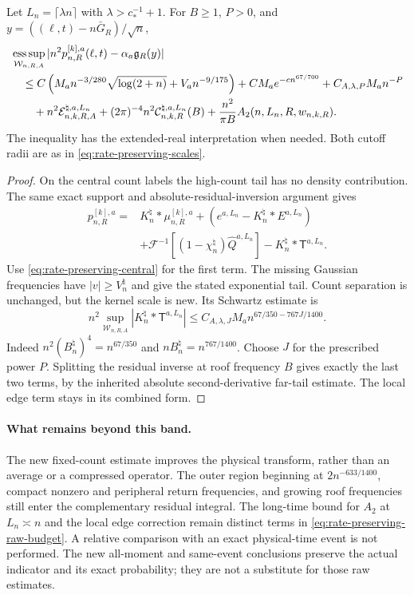 \begin{corollary}
\label{cor:rate-preserving-raw-budget}
Let $L_n=\lceil\lambda n\rceil$ with $\lambda>c_*^{-1}+1$.
For $B\ge1$, $P>0$, and $y=((\ell,t)-n\bar G_R)/\sqrt n$,
\begin{align}
 &\mathop{\rm ess\,sup}_{\mathcal W_{n,R,A}}
        |n^2p_{n,R}^{[k],a}(\ell,t)-\alpha_a\mathfrak g_R(y)|\notag\\
 &\quad\le C\left(M_an^{-3/280}\sqrt{\log(2+n)}+V_an^{-9/175}\right)
      +CM_ae^{-c n^{67/700}}+C_{A,\lambda,P}M_an^{-P}\notag\\
 &\qquad+n^2\mathcal E^{\natural,a,L_n}_{n,k,R,A}
     +(2\pi)^{-4}n^2\mathcal C^{\natural,a,L_n}_{n,k,R}(B)
     +\frac{n^2}{\pi B}A_2(n,L_n,R,w_{n,k,R}).
 \label{eq:rate-preserving-raw-budget}
\end{align}
The inequality has the extended-real interpretation when needed.
Both cutoff radii are as in \eqref{eq:rate-preserving-scales}.
\end{corollary}
\begin{proof}
On the central count labels the high-count tail has no density
contribution. The same exact support and absolute-residual-inversion
argument gives
\begin{align*}
 p_{n,R}^{[k],a}={}&K_n^\natural*\mu_{n,R}^{[k],a}
       +(e^{a,L_n}-K_n^\natural*E^{a,L_n})\\
 &+\mathcal F^{-1}[(1-\chi_n^\natural)\widehat Q^{a,L_n}]
       -K_n^\natural*\mathsf T^{a,L_n}.
\end{align*}
Use \eqref{eq:rate-preserving-central} for the first term. The missing
Gaussian frequencies have $|v|\ge V_n^\natural$ and give the stated
exponential tail. Count separation is unchanged, but the kernel scale
is new. Its Schwartz estimate is
\[
 n^2\sup_{\mathcal W_{n,R,A}}|K_n^\natural*\mathsf T^{a,L_n}|
       \le C_{A,\lambda,J}M_a
                     n^{67/350-767J/1400}.
\]
Indeed $n^2(B_n^\natural)^4=n^{67/350}$ and
$nB_n^\natural=n^{767/1400}$. Choose $J$ for the prescribed power
$P$. Splitting the residual inverse at roof frequency $B$ gives
exactly the last two terms, by the inherited absolute second-derivative
far-tail estimate. The local edge term stays in its combined form.
\end{proof}

\paragraph{What remains beyond this band.}
The new fixed-count estimate improves the physical transform, rather
than an average or a compressed operator. The outer region beginning
at $2n^{-633/1400}$, compact nonzero and peripheral return frequencies,
and growing roof frequencies still enter the complementary residual
integral. The long-time bound for $A_2$ at $L_n\asymp n$ and the local
edge correction remain distinct terms in
\eqref{eq:rate-preserving-raw-budget}. A relative comparison with an
exact physical-time event is not performed. The new all-moment and
same-event conclusions preserve the actual indicator and its exact
probability; they are not a substitute for those raw estimates.
